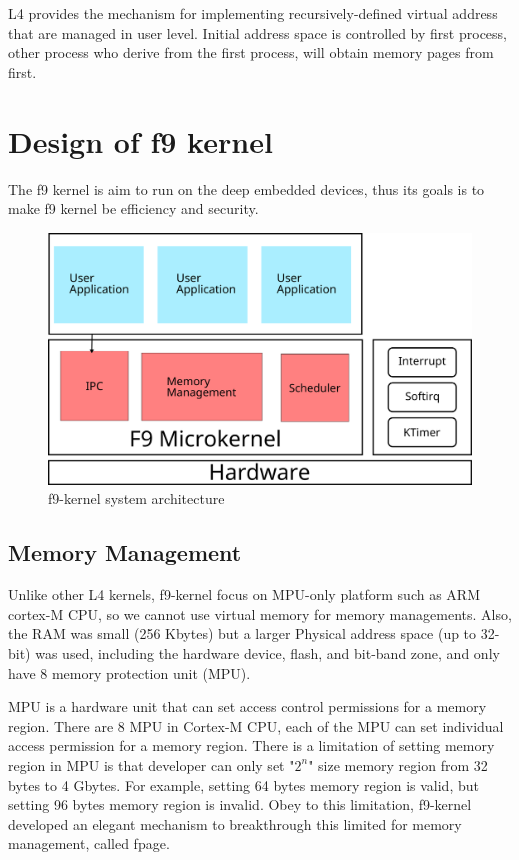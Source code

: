 \documentclass[10pt,preprint,nocopyrightspace]{sigplanconf}
\begin{document}
L4 provides the mechanism for implementing recursively-defined virtual address that are managed in user level\cite{dannowski2011l4}. Initial address space is controlled by first process, other process who derive from the first process, will obtain memory pages from first.

\section{Design of f9 kernel}

The f9 kernel is aim to run on the deep embedded devices, thus its goals is to make f9 kernel be efficiency and security.

\begin{figure}[H]
	\begin{center}
		\includegraphics[width=\linewidth]{picture/f9_arch.png}
	\end{center}
	\caption{f9-kernel system architecture}
	\label{fig:f9}
\end{figure}

\subsection{Memory Management}

Unlike other L4 kernels, f9-kernel focus on MPU-only platform such as ARM cortex-M CPU, so we cannot use virtual memory for memory managements. Also, the RAM was small (256 Kbytes) but a larger Physical address space (up to 32-bit) was used, including the hardware device, flash, and bit-band zone, and only have 8 memory protection unit (MPU)\cite{arm2016mpu,yiu2013definitive,st2016managing,usna2015l18}.

MPU is a hardware unit that can set access control permissions for a memory region. There are 8 MPU in Cortex-M CPU, each of the MPU can set individual access permission for a memory region. There is a limitation of setting memory region in MPU is that developer can only set "$2^n$" size memory region from 32 bytes to 4 Gbytes\cite{yiu2013definitive,st2016managing}. For example, setting 64 bytes memory region is valid, but setting 96 bytes memory region is invalid. Obey to this limitation, f9-kernel developed an elegant mechanism to breakthrough this limited for memory management, called fpage.
\end{document}
